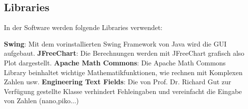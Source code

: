 \subsection{Libraries} \label{subsec:Libraries}

In der Software werden folgende Libraries verwendet:

\textbf{Swing}: Mit dem vorinstallierten Swing Framework von Java wird die GUI aufgebaut.\newline
\textbf{JFreeChart}: Die Berechnungen werden mit JFreeChart grafisch also Plot dargestellt. \cite{jfreechart} \newline
\textbf{Apache Math Commons}: Die Apache Math Commons Library beinhaltet wichtige Mathematikfunktionen, wie rechnen mit Komplexen Zahlen usw. \cite{apache}\newline
\textbf{Engineering Text Fields}: Die von Prof. Dr. Richard Gut zur Verfügung gestellte Klasse verhindert Fehleingaben und vereinfacht die Eingabe von Zahlen (nano,piko...)

\newpage
